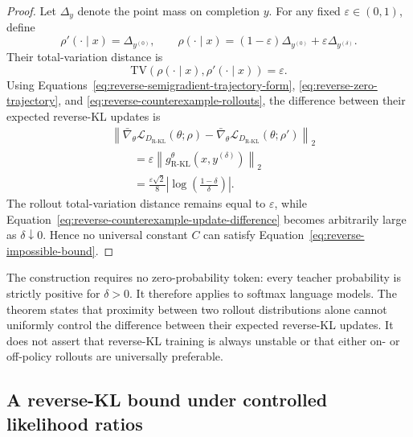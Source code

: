 \documentclass{article} %
\theoremstyle{plain}
\theoremstyle{definition}
\theoremstyle{remark}
\begin{document}
\begin{proof}
Let $\Delta_y$ denote the point mass on completion $y$.  For any fixed
$\varepsilon\in(0,1)$, define
\begin{equation}
    \rho'(\cdot\mid x)=\Delta_{y^{(0)}},
    \qquad
    \rho(\cdot\mid x)
    =(1-\varepsilon)\Delta_{y^{(0)}}
      +\varepsilon\Delta_{y^{(\delta)}}.
    \label{eq:reverse-counterexample-rollouts}
\end{equation}
Their total-variation distance is
\begin{equation}
    \mathrm{TV}\!\left(
        \rho(\cdot\mid x),
        \rho'(\cdot\mid x)
    \right)
    =\varepsilon.
\end{equation}
Using Equations~\ref{eq:reverse-semigradient-trajectory-form},
\ref{eq:reverse-zero-trajectory}, and
\ref{eq:reverse-counterexample-rollouts}, the difference between their
expected reverse-KL updates is
\begin{align}
    &\left\lVert
        \bar\nabla_\theta
        \mathcal L_{D_{\mathrm{R\text{-}KL}}}(\theta;\rho)
        -
        \bar\nabla_\theta
        \mathcal L_{D_{\mathrm{R\text{-}KL}}}(\theta;\rho')
    \right\rVert_2\nonumber\\
    &\qquad=
    \varepsilon
    \left\lVert
        g_{\mathrm{R\text{-}KL}}^\theta(x,y^{(\delta)})
    \right\rVert_2\\
    &\qquad=
    \frac{\varepsilon\sqrt2}{8}
    \left|\log\left(\frac{1-\delta}{\delta}\right)\right|.
    \label{eq:reverse-counterexample-update-difference}
\end{align}
The rollout total-variation distance remains equal to $\varepsilon$, while
Equation~\ref{eq:reverse-counterexample-update-difference} becomes
arbitrarily large as $\delta\downarrow0$.  Hence no universal constant $C$ can
satisfy Equation~\ref{eq:reverse-impossible-bound}.
\end{proof}

The construction requires no zero-probability token: every teacher probability
is strictly positive for $\delta>0$.  It therefore applies to softmax language
models.  The theorem states that proximity between two rollout distributions
alone cannot uniformly control the difference between their expected
reverse-KL updates.  It does not assert that reverse-KL training is always
unstable or that either on- or off-policy rollouts are universally preferable.

\subsection{A reverse-KL bound under controlled likelihood ratios}
\label{app:reverse-bounded-ratios}
\end{document}
